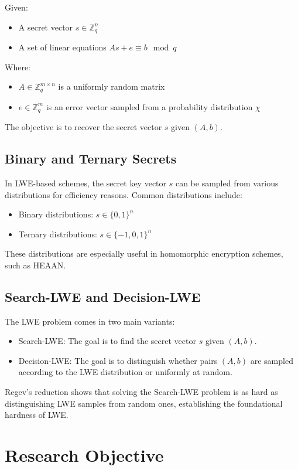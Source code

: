 \documentclass[12pt,a4paper]{article}
\begin{document}
Given:
\begin{itemize}
    \item A secret vector $s \in \mathbb{Z}_q^n$
    \item A set of linear equations $As + e \equiv b \mod q$
\end{itemize}

Where:
\begin{itemize}
    \item $A \in \mathbb{Z}_q^{m \times n}$ is a uniformly random matrix
    \item $e \in \mathbb{Z}_q^m$ is an error vector sampled from a probability distribution $\chi$
\end{itemize}

The objective is to recover the secret vector $s$ given $(A, b)$.

\subsection{Binary and Ternary Secrets}
In LWE-based schemes, the secret key vector $s$ can be sampled from various distributions for efficiency reasons. Common distributions include:
\begin{itemize}
    \item Binary distributions: $s \in \{0, 1\}^n$
    \item Ternary distributions: $s \in \{-1, 0, 1\}^n$
\end{itemize}

These distributions are especially useful in homomorphic encryption schemes, such as HEAAN.

\subsection{Search-LWE and Decision-LWE}
The LWE problem comes in two main variants:
\begin{itemize}
    \item Search-LWE: The goal is to find the secret vector $s$ given $(A, b)$.
    \item Decision-LWE: The goal is to distinguish whether pairs $(A, b)$ are sampled according to the LWE distribution or uniformly at random.
\end{itemize}

Regev's reduction shows that solving the Search-LWE problem is as hard as distinguishing LWE samples from random ones, establishing the foundational hardness of LWE.

\section{Research Objective}
\end{document}
